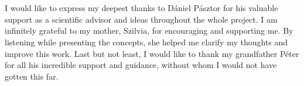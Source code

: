 \chapter*{\koszonetnyilvanitas}

I would like to express my deepest thanks to D\'aniel P\'asztor for his valuable support as a scientific advisor and ideas throughout the whole project. I am infinitely grateful to my mother, Szilvia, for encouraging and supporting me. By listening while presenting the concepts, she helped me clarify my thoughts and improve this work. Last but not least, I would like to thank my grandfather P\'eter for all his incredible support and guidance, without whom I would not have gotten this far.
